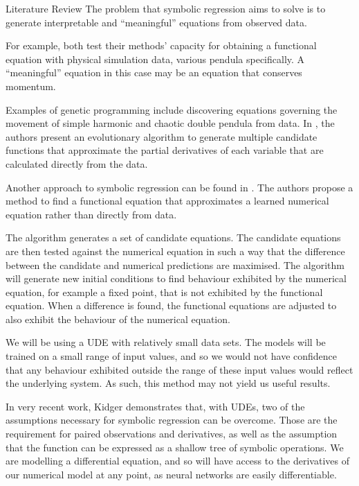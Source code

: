 \documentclass[12pt]{amsart}
\begin{document}
\begin{section}{Literature Review}
        The problem that symbolic regression aims to solve is to generate interpretable and ``meaningful'' equations from observed data. 
        
        For example, both  test their methods' capacity for obtaining a functional equation with physical simulation data, various pendula specifically. A ``meaningful'' equation in this case may be an equation that conserves momentum.

        Examples of genetic programming include discovering equations governing the movement of simple harmonic and chaotic double pendula from data\cite{schmidt2009distilling}. In , the authors present an evolutionary algorithm to generate multiple candidate functions that approximate the partial derivatives of each variable that are calculated directly from the data. 
        
        Another approach to symbolic regression can be found in \cite{bongard2007automated}. The authors propose a method to find a functional equation that approximates a learned numerical equation rather than directly from data. 
        
        The algorithm generates a set of candidate equations. The candidate equations are then tested against the numerical equation in such a way that the difference between the candidate and numerical predictions are maximised. The algorithm will generate new initial conditions to find behaviour exhibited by the numerical equation, for example a fixed point, that is not exhibited by the functional equation. When a difference is found, the functional equations are adjusted to also exhibit the behaviour of the numerical equation. 
        
        We will be using a UDE with relatively small data sets. The models will be trained on a small range of input values, and so we would not have confidence that any behaviour exhibited outside the range of these input values would reflect the underlying system. As such, this method may not yield us useful results.
        
        In very recent work, Kidger\cite{kidger2022neural} demonstrates that, with UDEs, two of the assumptions necessary for symbolic regression can be overcome. Those are the requirement for paired observations and derivatives, as well as the assumption that the function can be expressed as a shallow tree of symbolic operations. We are modelling a differential equation, and so will have access to the derivatives of our numerical model at any point, as neural networks are easily differentiable. 


\end{section}
\end{document}
